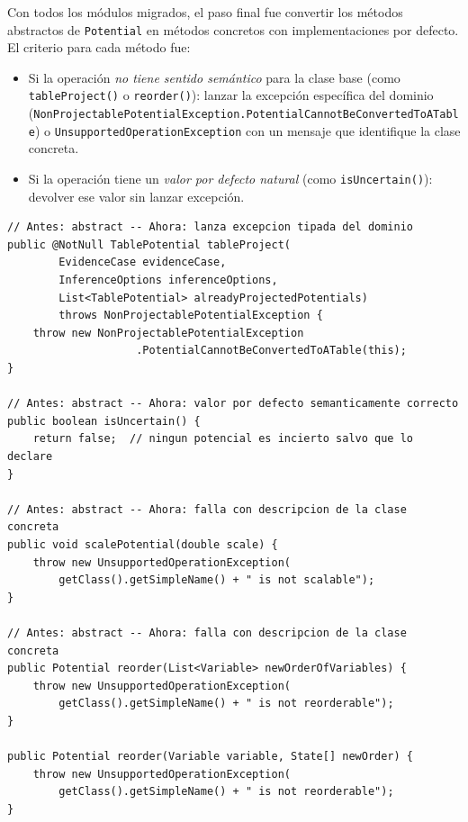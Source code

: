 \documentclass[11pt,a4paper]{article}
\newcommand{\code}[1]{\texttt{#1}}
\begin{document}
Con todos los módulos migrados, el paso final fue convertir los métodos
abstractos de \code{Potential} en métodos concretos con implementaciones
por defecto.  El criterio para cada método fue:

\begin{itemize}
  \item Si la operación \emph{no tiene sentido semántico} para la clase
        base (como \code{tableProject()} o \code{reorder()}): lanzar la
        excepción específica del dominio
        (\code{Non\-Projectable\-Potential\-Exception.\-Potential\-Cannot\-Be\-Converted\-To\-A\-Table})
        o \code{UnsupportedOperationException} con un mensaje que identifique
        la clase concreta.

  \item Si la operación tiene un \emph{valor por defecto natural}
        (como \code{isUncertain()}): devolver ese valor sin lanzar excepción.
\end{itemize}

\begin{lstlisting}[caption={Métodos concretos en \code{Potential} tras el Paso~4}]
// Antes: abstract -- Ahora: lanza excepcion tipada del dominio
public @NotNull TablePotential tableProject(
        EvidenceCase evidenceCase,
        InferenceOptions inferenceOptions,
        List<TablePotential> alreadyProjectedPotentials)
        throws NonProjectablePotentialException {
    throw new NonProjectablePotentialException
                    .PotentialCannotBeConvertedToATable(this);
}

// Antes: abstract -- Ahora: valor por defecto semanticamente correcto
public boolean isUncertain() {
    return false;  // ningun potencial es incierto salvo que lo declare
}

// Antes: abstract -- Ahora: falla con descripcion de la clase concreta
public void scalePotential(double scale) {
    throw new UnsupportedOperationException(
        getClass().getSimpleName() + " is not scalable");
}

// Antes: abstract -- Ahora: falla con descripcion de la clase concreta
public Potential reorder(List<Variable> newOrderOfVariables) {
    throw new UnsupportedOperationException(
        getClass().getSimpleName() + " is not reorderable");
}

public Potential reorder(Variable variable, State[] newOrder) {
    throw new UnsupportedOperationException(
        getClass().getSimpleName() + " is not reorderable");
}
\end{lstlisting}
\end{document}
